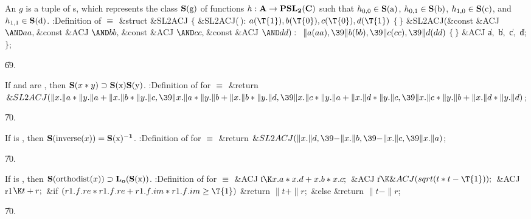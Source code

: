 An  $g$ is a tuple  of s,
which represents the class $\bf S(\hbox{g})$ of functions
$h : \bf A \rightarrow \bf PSL_2(\bf C)$
such that $h_{0,0} \in \bf S(\hbox{a})$, $h_{0,1} \in \bf S(\hbox{b})$,
$h_{1,0} \in \bf S(\hbox{c})$, and $h_{1,1} \in \bf S(\hbox{d})$.
\Y\B\4:Definition of \X${}\equiv{}$\6
\&{struct} \&{SL2ACJ} ${}\{{}$\1\6
\4\&{SL2ACJ}(\,):\5
${}\|a(\T{1}),\39\|b(\T{0}),\39\|c(\T{0}),\39\|d(\T{1}){}$\1\1\2\2\6
${}\{\,\}{}$\7
\4\&{SL2ACJ}(\&{const} \&{ACJ} ${}{\AND}\\{aa},\39{}$\&{const} \&{ACJ} ${}{%
\AND}\\{bb},\39{}$\&{const} \&{ACJ} ${}{\AND}\\{cc},\39{}$\&{const} \&{ACJ}
${}{\AND}\\{dd}):{}$\5
${}\|a(\\{aa}),\39\|b(\\{bb}),\39\|c(\\{cc}),\39\|d(\\{dd}){}$\1\1\2\2\6
${}\{\,\}{}$\7
\&{ACJ} \|a${},{}$ \|b${},{}$ \|c${},{}$ \|d;\2\6
${}\}{}$;\par
\U69.\fi

If  and  are , then
$\reps{\PB{$\|x*\|y$}} \supset \reps{x} \reps{y}$.
\endproposition
\Y\B\4:Definition of  for \X${}%
\E{}$\6
\&{return} ${}\&{SL2ACJ}(\|x.\|a*\|y.\|a+\|x.\|b*\|y.\|c,\39\|x.\|a*\|y.\|b+%
\|x.\|b*\|y.\|d,\39\|x.\|c*\|y.\|a+\|x.\|d*\|y.\|c,\39\|x.\|c*\|y.\|b+\|x.\|d*%
\|y.\|d){}$;\par
\U70.\fi

If  is , then
\endproposition
$\reps{\PB{\\{inverse}(\|x)}} = \reps{x}^{-1}$.
\Y\B\4:Definition of  for \X${}%
\E{}$\6
\&{return} ${}\&{SL2ACJ}(\|x.\|d,\39{-}\|x.\|b,\39{-}\|x.\|c,\39\|x.\|a){}$;\par
\U70.\fi

If  is , then
\endproposition
$\reps{\PB{\\{orthodist}(\|x)}} \supset \olength{\reps{x}}$.
\Y\B\4:Definition of  for \X${}%
\E{}$\6
\&{ACJ} \|t${}\K\|x.\|a*\|x.\|d+\|x.\|b*\|x.\|c;{}$\6
\&{ACJ} \|r${}\K\&{ACJ}(\\{sqrt}(\|t*\|t-\T{1}));{}$\6
\&{ACJ} \\{r1}${}\K\|t+\|r;{}$\7
\&{if} ${}(\\{r1}.\|f.\\{re}*\\{r1}.\|f.\\{re}+\\{r1}.\|f.\\{im}*\\{r1}.\|f.%
\\{im}\G\T{1}){}$\1\5
\&{return} ${}\|t+\|r;{}$\2\6
\&{else}\1\5
\&{return} ${}\|t-\|r{}$;\2\par
\U70.\fi

